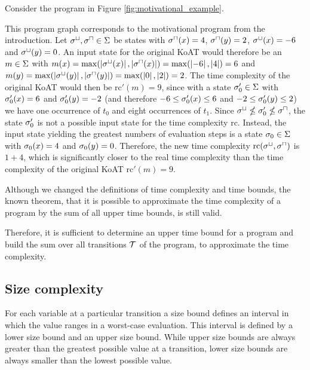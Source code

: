 \begin{example}
  Consider the program in Figure \ref{fig:motivational_example}.
  
  This program graph corresponds to the motivational program from the introduction.
  Let ${\sigma^\sqcup}, {\sigma^\sqcap} \in \Sigma$ be states with ${\sigma^\sqcap}(x) = 4$, ${\sigma^\sqcap}(y) = 2$, ${\sigma^\sqcup}(x) = -6$ and ${\sigma^\sqcup}(y) = 0$.
  An input state for the original KoAT would therefore be an $m \in \Sigma$ with $m(x) = \max(\left|{\sigma^\sqcup}(x)\right|, \left|{\sigma^\sqcap}(x)\right|) = \max(\left|-6\right|, \left|4\right|) = 6$ and $m(y) = \max(\left|{\sigma^\sqcup}(y)\right|, \left|{\sigma^\sqcap}(y)\right|) = \max(\left|0\right|, \left|2\right|) = 2$.
  The time complexity of the original KoAT would then be $\text{rc}'(m) = 9$, since with a state $\sigma'_0 \in \Sigma$ with $\sigma'_0(x) = 6$ and $\sigma'_0(y) = -2$ (and therefore $-6 \leq \sigma'_0(x) \leq 6$ and $-2 \leq \sigma'_0(y) \leq 2$) we have one occurrence of $t_0$ and eight occurrences of $t_1$.
  Since ${\sigma^\sqcup} \nleq \sigma'_0 \nleq {\sigma^\sqcap}$, the state $\sigma'_0$ is not a possible input state for the time complexity $\text{rc}$.
  Instead, the input state yielding the greatest numbers of evaluation steps is a state $\sigma_0 \in \Sigma$ with $\sigma_0(x) = 4$ and $\sigma_0(y) = 0$.
  Therefore, the new time complexity $\text{rc}({\sigma^\sqcup}, {\sigma^\sqcap})$ is $1 + 4$, which is significantly closer to the real time complexity than the time complexity of the original KoAT $\text{rc}'(m) = 9$.
\end{example}
  
Although we changed the definitions of time complexity and time bounds, the known theorem, that it is possible to approximate the time complexity of a program by the sum of all upper time bounds, is still valid.



Therefore, it is sufficient to determine an upper time bound for a program and build the sum over all transitions $\mathcal{T}$ of the program, to approximate the time complexity. 

\subsection{Size complexity}

For each variable at a particular transition a size bound defines an interval in which the value ranges in a worst-case evaluation.
This interval is defined by a lower size bound and an upper size bound.
While upper size bounds are always greater than the greatest possible value at a transition, lower size bounds are always smaller than the lowest possible value.

